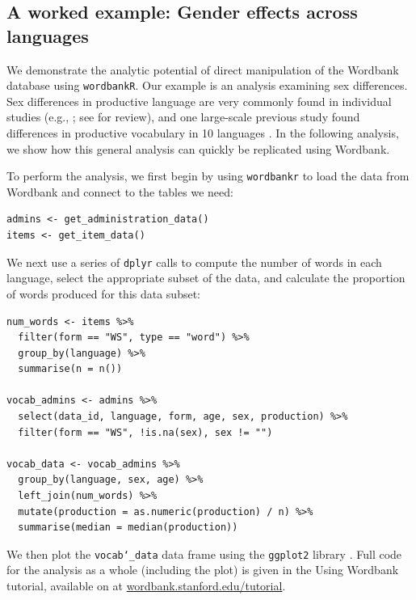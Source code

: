 \documentclass[doc,noapacite]{apa2}
\begin{document}
\subsection{A worked example: Gender effects across languages}

We demonstrate the analytic potential of direct manipulation of the Wordbank database using \texttt{wordbankR}. Our example is an analysis examining sex differences. Sex differences in productive language are very commonly found in individual studies (e.g., ; see  for review), and one large-scale previous study found differences in productive vocabulary in 10 languages \cite{eriksson2012}. In the following analysis, we show how this general analysis can quickly be replicated using Wordbank.

To perform the analysis, we first begin by using \texttt{wordbankr} to load the data from Wordbank and connect to the tables we need:

\begin{lstlisting}
admins <- get_administration_data()
items <- get_item_data()
\end{lstlisting}

\noindent We next use a series of \texttt{dplyr} calls to compute the number of words in each language,  select the appropriate subset of the data, and calculate the proportion of words produced for this data subset:

\begin{lstlisting}
num_words <- items %>%
  filter(form == "WS", type == "word") %>%
  group_by(language) %>%
  summarise(n = n())

vocab_admins <- admins %>%
  select(data_id, language, form, age, sex, production) %>%
  filter(form == "WS", !is.na(sex), sex != "")

vocab_data <- vocab_admins %>%
  group_by(language, sex, age) %>%
  left_join(num_words) %>%
  mutate(production = as.numeric(production) / n) %>%
  summarise(median = median(production))
\end{lstlisting}

\noindent We then plot the \texttt{vocab\char`_data} data frame using the \texttt{ggplot2} library \cite{wickham2009}. Full code for the analysis as a whole (including the plot) is given in the Using Wordbank tutorial, available on at \url{wordbank.stanford.edu/tutorial}.
\end{document}
